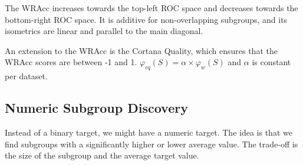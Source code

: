 The WRAcc increases towards the top-left ROC space and decreases
towards the bottom-right ROC space. It is additive for non-overlapping
subgroups, and its isometrics are linear and parallel to the main
diagonal.

\begin{definition}
  An extension to the WRAcc is the Cortana Quality, which ensures that
  the WRAcc scores are between -1 and 1. $\varphi_{cq}(S) = \alpha \times
  \varphi_{w}(S)$ and $\alpha$ is constant per dataset.
\end{definition}

\subsection{Numeric Subgroup Discovery}

Instead of a binary target, we might have a numeric target. The idea is
that we find subgroups with a significantly higher or lower average value.
The trade-off is the size of the subgroup and the average target value.


